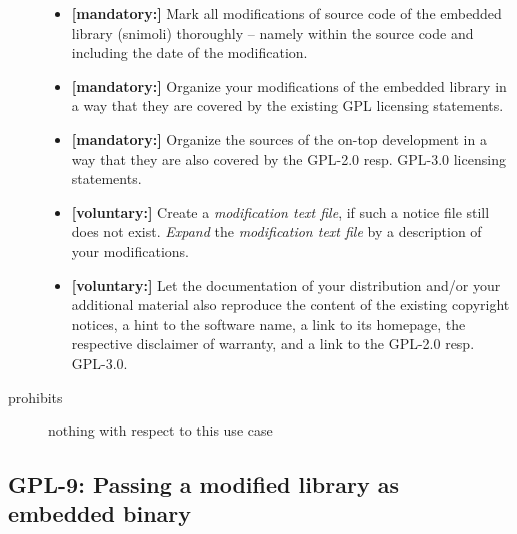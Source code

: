 \begin{description}
\begin{itemize}
  \item \textbf{[mandatory:]} Mark all modifications of source code of the
  embedded library (snimoli) thoroughly -- namely within the source code and
  including the date of the modification.
  
  \item \textbf{[mandatory:]} Organize your modifications of the embedded
  library in a way that they are covered by the existing GPL licensing
  statements. 
  
  \item \textbf{[mandatory:]} Organize the sources of the on-top development in
  a way that they are also covered by the GPL-2.0 resp. GPL-3.0 licensing
  statements.
     
  \item \textbf{[voluntary:]} Create a \emph{modification text file}, if such a
  notice file still does not exist. \emph{Expand} the \emph{modification text
  file} by a description of your modifications.
  
  \item \textbf{[voluntary:]} Let the documentation of your distribution and/or
  your additional material also reproduce the content of the existing
  copyright notices, a hint to the software name, a link to its homepage,
  the respective disclaimer of warranty, and a link to the GPL-2.0 resp.
  GPL-3.0.
  
\end{itemize}

\item[prohibits] nothing with respect to this use case

\end{description}


\subsection{GPL-9: Passing a modified library as embedded binary}
\label{OSUC-10B-GPL}

